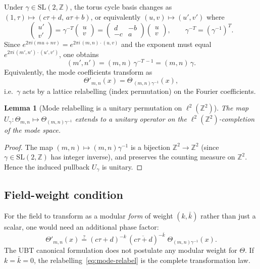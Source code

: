\documentclass[12pt,a4paper]{article}
\newtheorem{lemma}[theorem]{Lemma}
\theoremstyle{definition}
\theoremstyle{remark}
\newcommand{\SL}{\mathrm{SL}}
\newcommand{\ZZ}{\mathbb{Z}}
\begin{document}
Under $\gamma\in\SL(2,\ZZ)$, the torus cycle basis changes as
$(1,\tau)\mapsto(c\tau+d,\,a\tau+b)$, or equivalently
$(u,v)\mapsto(u',v')$ where
\begin{equation}
  \begin{pmatrix}u'\\v'\end{pmatrix}
  = \gamma^{-T}\begin{pmatrix}u\\v\end{pmatrix}
  = \begin{pmatrix}d&-b\\-c&a\end{pmatrix}\begin{pmatrix}u\\v\end{pmatrix},
  \qquad \gamma^{-T}=(\gamma^{-1})^T.
\end{equation}
Since $e^{2\pi i(mu+nv)}=e^{2\pi i\,(m,n)\cdot(u,v)}$ and the exponent must
equal $e^{2\pi i\,(m',n')\cdot(u',v')}$, one obtains
\begin{equation}
  (m',n') = (m,n)\,\gamma^{-T\,-1} = (m,n)\,\gamma.
\end{equation}
Equivalently, the mode coefficients transform as
\begin{equation}
  \boxed{
    \Theta'_{m,n}(x) = \Theta_{\,(m,n)\gamma^{-1}}(x),
  }
  \label{eq:mode-relabel}
\end{equation}
i.e.\ $\gamma$ acts by a lattice relabelling (index permutation) on the
Fourier coefficients.

\begin{lemma}[Mode relabelling is a unitary permutation on $\ell^2(\ZZ^2)$]
\label{lem:unitary}
The map $U_\gamma:\Theta_{m,n}\mapsto\Theta_{(m,n)\gamma^{-1}}$ extends to a
unitary operator on the $\ell^2(\ZZ^2)$-completion of the mode space.
\end{lemma}
\begin{proof}
The map $(m,n)\mapsto(m,n)\gamma^{-1}$ is a bijection $\ZZ^2\to\ZZ^2$
(since $\gamma\in\SL(2,\ZZ)$ has integer inverse), and preserves the counting
measure on $\ZZ^2$.  Hence the induced pullback $U_\gamma$ is unitary.
\qedhere
\end{proof}

\subsection{Field-weight condition}

For the field to transform as a modular \emph{form} of weight $(k,\bar k)$
rather than just a scalar, one would need an additional phase factor:
\begin{equation}
  \Theta'_{m,n}(x) \stackrel{?}{=}
  (c\tau+d)^{-k}\,(\overline{c\tau+d})^{-\bar k}\;
  \Theta_{(m,n)\gamma^{-1}}(x).
  \label{eq:weight-cond}
\end{equation}
The UBT canonical formulation does not postulate any modular weight for
$\Theta$.  If $k=\bar k=0$, the relabelling~\eqref{eq:mode-relabel} is the
complete transformation law.
\end{document}
